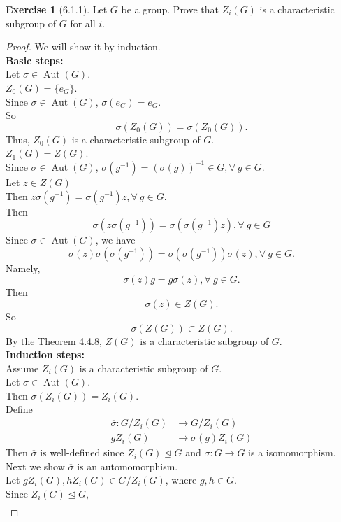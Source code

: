 \documentclass{amsart}
\theoremstyle{plain}
\theoremstyle{definition}
\newtheorem{exer}[lem]{Exercise}
\begin{document}
\begin{exer}[6.1.1]
Let $G$ be a group. 
Prove that $Z_i(G)$ is a characteristic subgroup of $G$ for all $i$. 
\begin{proof}
	We will show it by induction.\\
	\textbf{ Basic steps:}\\
	Let $\sigma \in \operatorname{Aut}(G)$.\\
	$Z_0(G) =\{e_G\}$.\\
	Since $\sigma \in \operatorname{Aut}(G)$, $\sigma(e_G) = e_G$. \\
	So
	\[\sigma(Z_0(G)) = \sigma(Z_0(G)).\]
	Thus, $Z_0(G)$ is a characteristic subgroup of $G$.\\
	$Z_1(G) = Z(G)$. \\
	Since $\sigma \in \operatorname{Aut}(G)$, $\sigma(g^{-1})  = (\sigma(g))^{-1} \in G, \forall\ g \in G$.\\
	Let $z \in Z(G)$\\
	Then $z\sigma(g^{-1}) = \sigma(g^{-1})z, \forall\ g \in G$.\\
    Then
    \[\sigma(z\sigma(g^{-1})) = \sigma(\sigma(g^{-1})z), \forall\ g \in G\]
    Since $\sigma \in \operatorname{Aut}(G)$, we have 
    \[\sigma(z)\sigma\left(\sigma(g^{-1})\right) = \sigma\left(\sigma(g^{-1})\right)\sigma(z), \forall\ g \in G.\]
    Namely,
    \[\sigma(z)g = g\sigma(z), \forall\ g \in G.\]
    Then 
    \[\sigma(z) \in Z(G).\]
    So
	\[\sigma(Z(G)) \subset Z(G).\]
	By the Theorem 4.4.8, $Z(G)$ is a characteristic subgroup of $G$.\\
	\textbf{Induction steps: }\\
	Assume $Z_i(G)$ is a characteristic subgroup of $G$.\\
	Let $\sigma \in \operatorname{Aut}(G)$.\\
	Then $\sigma(Z_i(G)) = Z_i(G)$.\\
	Define 
	\begin{align*}
	  \overline{\sigma} : G/Z_i(G) &\to G/Z_i(G) \\
	  						gZ_i(G) &\to \sigma(g)Z_i(G)  
	\end{align*}
	Then $\overline{\sigma}$ is well-defined since $Z_i(G) \unlhd G$ and $\sigma:G\to G$ is a isomomorphism.\\
	Next we show $\overline{\sigma}$ is an automomorphism.\\
	Let $gZ_i(G), hZ_i(G) \in G/Z_i(G)$, where $g,h\in G$.\\
	Since $Z_i(G) \unlhd G$,
	\begin{align*}

\end{align*}
\end{proof}
\end{exer}
\end{document}
